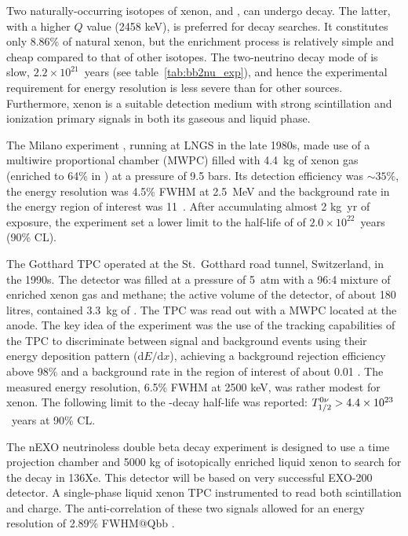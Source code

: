 Two naturally-occurring isotopes of xenon,  and , can undergo \bb decay. The latter, with a higher $Q$ value (2458 keV), is preferred for \bbonu decay searches. It constitutes only 8.86\% of natural xenon, but the enrichment process is relatively simple and cheap compared to that of other \bb isotopes. The two-neutrino decay mode of  is slow, $2.2\times10^{21}$~years (see table~\ref{tab:bb2nu_exp}), and hence the experimental requirement for energy resolution is less severe than for other \bb sources. Furthermore, xenon is a suitable detection medium with strong scintillation and ionization primary signals in both its gaseous and liquid phase.

The Milano experiment \cite{Zanotti:1991vh}, running at LNGS in the late 1980s, made use of a multiwire proportional chamber (MWPC) filled with 4.4~kg of xenon gas (enriched to 64\% in ) at a pressure of 9.5 bars. Its detection efficiency was $\sim35\%$, the energy resolution was 4.5\% FWHM at 2.5~MeV and the background rate in the energy region of interest was 11~\ckky. After accumulating almost 2 kg~yr of exposure, the experiment set a lower limit to the half-life of  of $2.0\times10^{22}$~years (90\% CL).

The Gotthard TPC \cite{Luscher:1998sd, Vuilleumier:1993zm} operated at the St.\ Gotthard road tunnel, Switzerland, in the 1990s. The detector was filled at a pressure of 5~atm with a 96:4 mixture of enriched xenon gas and methane; the active volume of the detector, of about 180 litres, contained 3.3~kg of . The TPC was read out with a MWPC located at the anode. The key idea of the experiment was the use of the tracking capabilities of the TPC to discriminate between signal and background events using their energy deposition pattern ($\mathrm{d}E/\mathrm{d}x$), achieving a background rejection efficiency above 98\% and a background rate in the region of interest of about 0.01 \ckkbby. The measured energy resolution, 6.5\% FWHM at 2500 keV, was rather modest for xenon. The following limit to the  \bbonu-decay half-life was reported: $T^{0\nu}_{1/2} > 4.4\times10^{23}$~years at 90\% CL. 




The nEXO neutrinoless double beta decay experiment is designed to use a time projection chamber and 5000 kg of isotopically enriched liquid xenon to search for the decay in 136Xe. This detector will be based on very successful EXO-200 detector. A single-phase liquid xenon TPC instrumented to read both scintillation and charge. The anti-correlation of these two signals allowed for an energy resolution of 2.89\% FWHM@Qbb \cite{EXO-200:2020wmu}.

